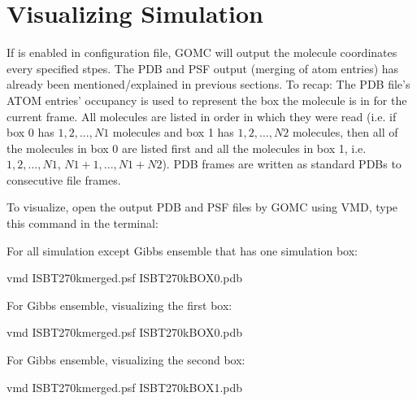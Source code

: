 \documentclass[letterpaper,10pt,english]{sphinxmanual}
\begin{document}
\section{Visualizing Simulation}
\label{\detokenize{howto:visualizing-simulation}}
\sphinxAtStartPar
If  is enabled in configuration file, GOMC will output the molecule coordinates every
specified stpes. The PDB and PSF output (merging of atom entries) has already been mentioned/explained in
previous sections. To recap: The PDB file’s ATOM entries’ occupancy is used to represent the box the molecule
is in for the current frame. All molecules are listed in order in which they were read (i.e. if box 0 has
\(1, 2, ..., N1\) molecules and box 1 has \(1, 2, ..., N2\) molecules, then all of the molecules in
box 0 are listed first and all the molecules in box 1, i.e. \(1, 2 ,... ,N1\), \(N1 + 1, ..., N1 + N2\)).
PDB frames are written as standard PDBs to consecutive file frames.

\sphinxAtStartPar
To visualize, open the output PDB and PSF files by GOMC using VMD, type this command in the terminal:

\sphinxAtStartPar
For all simulation except Gibbs ensemble that has one simulation box:

\begin{sphinxVerbatim}[commandchars=\\\{\}]
\PYGZdl{} vmd   ISB\PYGZus{}T\PYGZus{}270\PYGZus{}k\PYGZus{}merged.psf  ISB\PYGZus{}T\PYGZus{}270\PYGZus{}k\PYGZus{}BOX\PYGZus{}0.pdb
\end{sphinxVerbatim}

\sphinxAtStartPar
For Gibbs ensemble, visualizing the first box:

\begin{sphinxVerbatim}[commandchars=\\\{\}]
\PYGZdl{} vmd   ISB\PYGZus{}T\PYGZus{}270\PYGZus{}k\PYGZus{}merged.psf  ISB\PYGZus{}T\PYGZus{}270\PYGZus{}k\PYGZus{}BOX\PYGZus{}0.pdb
\end{sphinxVerbatim}

\sphinxAtStartPar
For Gibbs ensemble, visualizing the second box:

\begin{sphinxVerbatim}[commandchars=\\\{\}]
\PYGZdl{} vmd   ISB\PYGZus{}T\PYGZus{}270\PYGZus{}k\PYGZus{}merged.psf  ISB\PYGZus{}T\PYGZus{}270\PYGZus{}k\PYGZus{}BOX\PYGZus{}1.pdb
\end{sphinxVerbatim}
\end{document}
